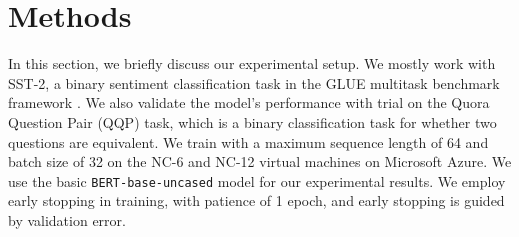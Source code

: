 \documentclass[10pt]{article}
\begin{document}













\section{Methods}
In this section, we briefly discuss our experimental setup. We mostly
work with
SST-2, a binary sentiment classification task in the GLUE multitask benchmark
framework \citep{wang2018glue}. We also validate the model's
performance with trial on the Quora Question Pair (QQP) task, which is a
binary classification task for whether two questions are equivalent. We
train with a maximum sequence length of 64 and batch size of 32 on the
NC-6 and NC-12 virtual machines on Microsoft Azure. We use the basic 
\texttt{BERT-base-uncased} model for our experimental results. We employ
early stopping in training, with patience of 1 epoch, and early stopping is
guided by validation error. 
\end{document}
